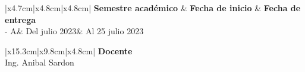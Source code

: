 \documentclass{article}
\newcommand{\itemAcademic}{2023 - A}
\newcommand{\itemInput}{Del  julio 2023}
\newcommand{\itemOutput}{Al 25 julio 2023}
\newcommand{\itemTeacher}{Ing. Anibal Sardon}
\begin{document}
	\begin{table}[H]
		\begin{tabular}{|x{4.7cm}|x{4.8cm}|x{4.8cm}|}
			\hline 
			\color{white}\textbf{Semestre académico} & \color{white}\textbf{Fecha de inicio}  & \color{white}\textbf{Fecha de entrega}   \\
			\hline 
			\itemAcademic & \itemInput &  \itemOutput  \\
			\hline 
		\end{tabular}
	\end{table}
 \begin{table}[H]
		\begin{tabular}{|x{15.3cm}|x{9.8cm}|x{4.8cm}|}
			\hline 
			\color{white}\textbf{Docente}  \\
		  \hline
            \itemTeacher  \\
            \hline
		\end{tabular}
	\end{table}




    \bigskip
    \vspace{80mm}
\end{document}

